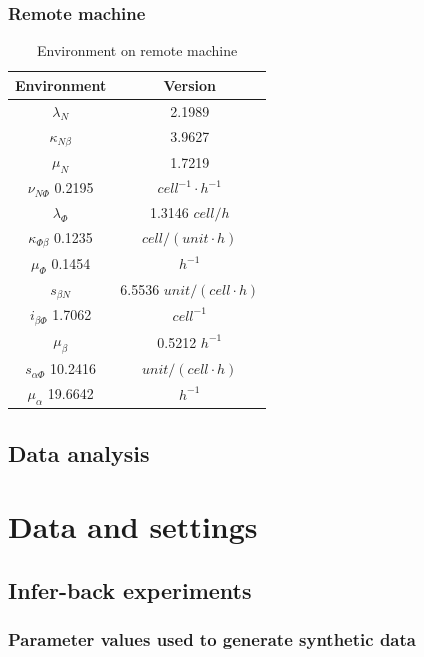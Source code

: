 \documentclass[12pt,a4paper]{report}
\begin{document}
\subsection{Remote machine}

\begin{table}[h!]
    \centering
    \begin{tabular}{|c c|} 
     \hline
     Environment & Version \\ [0.5ex] 
     \hline\hline
     $\lambda_N$ & 2.1989  \\ 
     $\kappa_{N\beta}$ & 3.9627  \\
     $\mu_N$ & 1.7219 \\
     $\nu_{N\Phi}$  0.2195 & $cell^{-1}\cdotp h^{-1}$ \\
     \hline
     $\lambda_\Phi$ & 1.3146  $cell/h$ \\
     $\kappa_{\Phi\beta}$ 0.1235 & $cell/(unit\cdotp h)$ \\
     $\mu_\Phi$  0.1454 & $h^{-1}$ \\
     \hline
     $s_{\beta N}$ &6.5536  $unit/(cell\cdotp h)$ \\
     $i_{\beta\Phi}$  1.7062 & $cell^{-1}$ \\
     $\mu_\beta$ &0.5212  $h^{-1}$ \\
     \hline
     $s_{\alpha\Phi}$  10.2416 & $unit/(cell\cdotp h)$ \\
     $\mu_\alpha$ 19.6642 & $h^{-1}$ \\
    [1ex] 
     \hline
    \end{tabular}
    \caption{Environment on remote machine}
    \label{table:remote_macine}
\end{table}

\section{Data analysis}

\chapter{Data and settings}






\section{Infer-back experiments}

\subsection{Parameter values used to generate synthetic data}
\end{document}
